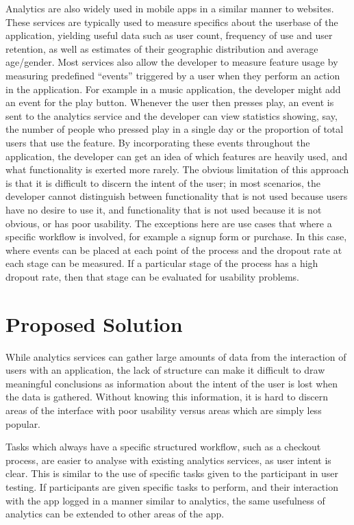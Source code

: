 Analytics are also widely used in mobile apps in a similar manner to websites.
These services are typically used to measure specifics about the userbase of
the application, yielding useful data such as user count, frequency of use and
user retention, as well as estimates of their geographic distribution and
average age/gender. Most services also allow the developer to measure feature
usage by measuring predefined ``events'' triggered by a user when they perform
an action in the application. For example in a music application, the developer
might add an event for the play button. Whenever the user then presses play, an
event is sent to the analytics service and the developer can view statistics
showing, say, the number of people who pressed play in a single day or the
proportion of total users that use the feature. By incorporating these events
throughout the application, the developer can get an idea of which features are
heavily used, and what functionality is exerted more rarely. The obvious
limitation of this approach is that it is difficult to discern the intent of
the user; in most scenarios, the developer cannot distinguish between
functionality that is not used because users have no desire to use it, and
functionality that is not used because it is not obvious, or has poor
usability. The exceptions here are use cases that where a specific workflow is
involved, for example a signup form or purchase. In this case, where events can
be placed at each point of the process and the dropout rate at each stage can
be measured. If a particular stage of the process has a high dropout rate, then
that stage can be evaluated for usability problems.

\section{Proposed Solution}

While analytics services can gather large amounts of data from the interaction
of users with an application, the lack of structure can make it difficult to
draw meaningful conclusions as information about the intent of the user is lost
when the data is gathered.  Without knowing this information, it is hard to
discern areas of the interface with poor usability versus areas which are
simply less popular.

Tasks which always have a specific structured workflow, such as a checkout
process, are easier to analyse with existing analytics services, as user intent
is clear. This is similar to the use of specific tasks given to the participant
in user testing. If participants are given specific tasks to perform, and their
interaction with the app logged in a manner similar to analytics, the same
usefulness of analytics can be extended to other areas of the app.

